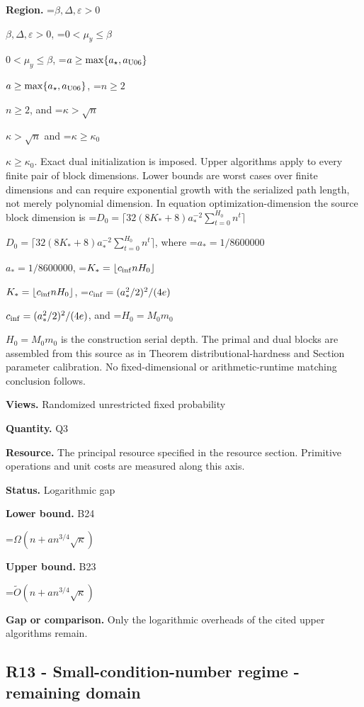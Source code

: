 \documentclass[10pt,a4paper]{article}
\newcommand{\AtlasMath}[1]{\par\begingroup\centering\setbox0=\hbox{$\displaystyle #1$}\ifdim\wd0>1.4\linewidth\typeout{ATLAS WIDE FORMULA: \the\wd0}\fi\ifdim\wd0>\linewidth\resizebox{\linewidth}{!}{\box0}\else\box0\fi\par\endgroup}
\newcommand{\AtlasInlineMath}[1]{\begingroup\setbox0=\hbox{$#1$}\ifdim\wd0>.4\linewidth\endgroup\AtlasMath{#1}\else\endgroup$#1$\fi}
\begin{document}
\textbf{Region.} \AtlasInlineMath{\beta,\Delta,\varepsilon>0}, \AtlasInlineMath{0<\mu_y\le\beta}, \AtlasInlineMath{a\ge\max\{a_\star,a_{\rm U06}\}}, \AtlasInlineMath{n\ge2}, and \AtlasInlineMath{\kappa>\sqrt n} and \AtlasInlineMath{\kappa\ge\kappa_0}. Exact dual initialization is imposed. Upper algorithms apply to every finite pair of block dimensions. Lower bounds are worst cases over finite dimensions and can require exponential growth with the serialized path length, not merely polynomial dimension. In equation optimization-dimension the source block dimension is \AtlasInlineMath{D_0=\lceil32(8K_*+8)a_*^{-2}\sum_{t=0}^{H_0}n^t\rceil}, where \AtlasInlineMath{a_*=1/8600000}, \AtlasInlineMath{K_*=\lfloor c_{\rm inf}nH_0\rfloor}, \AtlasInlineMath{c_{\rm inf}=(a_*^2/2)^2/(4e)}, and \AtlasInlineMath{H_0=M_0m_0} is the construction serial depth. The primal and dual blocks are assembled from this source as in Theorem distributional-hardness and Section parameter calibration. No fixed-dimensional or arithmetic-runtime matching conclusion follows.



\textbf{Views.} Randomized unrestricted fixed probability



\textbf{Quantity.} Q3



\textbf{Resource.} The principal resource specified in the resource section. Primitive operations and unit costs are measured along this axis.



\textbf{Status.} Logarithmic gap



\textbf{Lower bound.} B24



\AtlasMath{\Omega(n+a n^{3/4}\sqrt\kappa)}


\textbf{Upper bound.} B23



\AtlasMath{\widetilde O(n+a n^{3/4}\sqrt\kappa)}


\textbf{Gap or comparison.} Only the logarithmic overheads of the cited upper algorithms remain.



\subsection{R13 - Small-condition-number regime - remaining domain}
\end{document}
